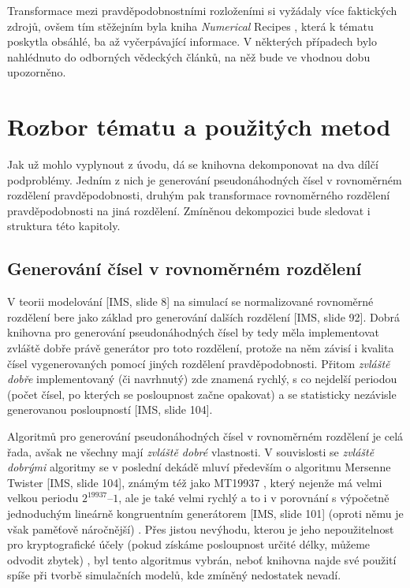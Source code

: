 \documentclass[a4paper,11pt]{article}
\begin{document}
Transformace mezi pravděpodobnostními rozloženími si vyžádaly více faktických zdrojů, ovšem tím stěžejním byla kniha \emph{Numerical} Recipes \cite{NR}, která k tématu poskytla obsáhlé, ba až vyčerpávající informace. V některých případech bylo nahlédnuto do odborných vědeckých článků, na něž bude ve vhodnou dobu upozorněno.


\section{Rozbor tématu a použitých metod}
Jak už mohlo vyplynout z úvodu, dá se knihovna dekomponovat na dva dílčí podproblémy. Jedním z nich je generování pseudonáhodných čísel v rovnoměrném rozdělení pravděpodobnosti, druhým pak transformace rovnoměrného rozdělení pravděpodobnosti na jiná rozdělení. Zmíněnou dekompozici bude sledovat i struktura této kapitoly.

\subsection{Generování čísel v rovnoměrném rozdělení}
V teorii modelování [IMS, slide 8] na simulací se normalizované rovnoměrné rozdělení bere jako základ pro generování dalších rozdělení [IMS, slide 92]. Dobrá knihovna pro generování pseudonáhodných čísel by tedy měla implementovat zvláště dobře právě generátor pro toto rozdělení, protože na něm závisí i kvalita čísel vygenerovaných pomocí jiných rozdělení pravděpodobnosti. Přitom \emph{zvláště dobře} implementovaný (či navrhnutý) zde znamená rychlý, s co nejdelší periodou (počet čísel, po kterých se posloupnost začne opakovat) a se statisticky nezávisle generovanou posloupností [IMS, slide 104].

Algoritmů pro generování pseudonáhodných čísel v rovnoměrném rozdělení je celá řada, avšak ne všechny mají \emph{zvláště dobré} vlastnosti. V souvislosti se \emph{zvláště dobrými} algoritmy se v poslední dekádě mluví především o algoritmu Mersenne Twister [IMS, slide 104], známým též jako MT19937 \cite{Matsumoto}, který nejenže má velmi velkou periodu $2^{19937} – 1$, ale je také velmi rychlý a to i v porovnání s výpočetně jednoduchým lineárně kongruentním generátorem [IMS, slide 101] (oproti němu je však paměťově náročnější) \cite{Matsumoto}. Přes jistou nevýhodu, kterou je jeho nepoužitelnost pro kryptografické účely (pokud získáme posloupnost určité délky, můžeme odvodit zbytek) \cite{Matsumoto}, byl tento algoritmus vybrán, neboť knihovna najde své použití spíše při tvorbě simulačních modelů, kde zmíněný nedostatek nevadí.
\end{document}
